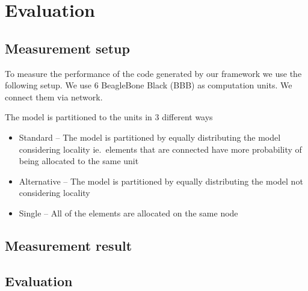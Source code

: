 
\chapter{Evaluation}


\section{Measurement setup}

To measure the performance of the code generated by our framework we use the following setup. We use 6 BeagleBone Black (BBB) \cite{BBB} as computation units. We connect them via network. 

The model is partitioned to the units in 3 different ways 
\begin{itemize}
	\item Standard -- The model is partitioned by equally distributing the model considering locality ie.\ elements that are connected have more probability of being allocated to the same unit
	\item Alternative -- The model is partitioned by equally distributing the model not considering locality
	\item Single -- All of the elements are allocated on the same node
\end{itemize}

\section{Measurement result}








\section{Evaluation}